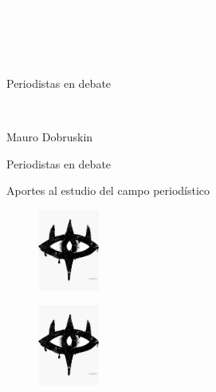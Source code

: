 \newpage
\thispagestyle{empty}
{\textcolor{white}{.}}

\newpage
\thispagestyle{empty}
{\textcolor{white}{.}}

\newpage
\thispagestyle{empty}
{\textcolor{white}{.}}

\vspace{30mm}

\begin{center}
	\LARGE{Periodistas en debate}
\end{center}

\newpage
\thispagestyle{empty}
{\textcolor{white}{.}}

\newpage
\thispagestyle{empty}
\begin{center}%
{\sc\large{Mauro Dobruskin}}\\ %
\end{center}

\vspace{30mm}

\begin{center}
\LARGE{Periodistas en debate}\\\vspace{10mm}

\Large{Aportes al estudio del campo periodístico}
\end{center}

\vfill

\begin{figure}[b]
\centering
\includegraphics[width=20mm]{./media/ojo.jpg}
\end{figure}

\newpage
\thispagestyle{empty}
\begin{figure}[t]
\centering
\vspace{-10mm}
\includegraphics[width=20mm]{./media/ojo.jpg}\\
\end{figure}

